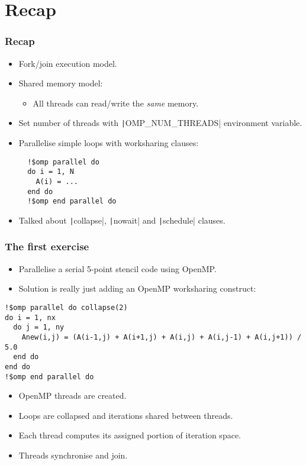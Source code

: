 \documentclass{beamer}
\begin{document}
\section{Recap}
\begin{frame}[fragile]
\frametitle{Recap}
\begin{itemize}
  \item Fork/join execution model.

  \item Shared memory model:
    \begin{itemize}
      \item All threads can read/write the \emph{same} memory.
    \end{itemize}

  \item Set number of threads with \texttt|OMP_NUM_THREADS| environment variable.

  \item Parallelise simple loops with worksharing clauses:
  \begin{verbatim}
  !$omp parallel do
  do i = 1, N
    A(i) = ...
  end do
  !$omp end parallel do
  \end{verbatim}

  \item Talked about \texttt|collapse|, \texttt|nowait| and \texttt|schedule| clauses.

\end{itemize}
\end{frame}
\begin{frame}[fragile]
\frametitle{The first exercise}

\begin{itemize}
  \item Parallelise a serial 5-point stencil code using OpenMP.
  \item Solution is really just adding an OpenMP worksharing construct:
\end{itemize}

\begin{verbatim}
!$omp parallel do collapse(2)
do i = 1, nx
  do j = 1, ny
    Anew(i,j) = (A(i-1,j) + A(i+1,j) + A(i,j) + A(i,j-1) + A(i,j+1)) / 5.0
  end do
end do
!$omp end parallel do
\end{verbatim}

\begin{itemize}
  \item OpenMP threads are created.
  \item Loops are collapsed and iterations shared between threads.
  \item Each thread computes its assigned portion of iteration space.
  \item Threads synchronise and join.
\end{itemize}

\end{frame}
\end{document}
